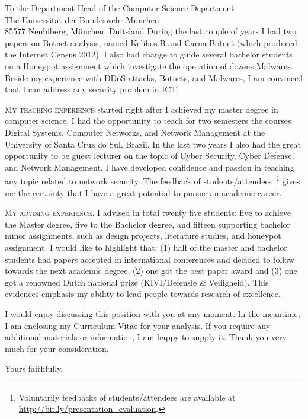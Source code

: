 \documentclass[11pt]{brownletter}
\begin{document}
\begin{letter}{To the Department Head of the Computer Science Department\\
		The Universit\"at der Bundeswehr M\"unchen\\
		85577 Neubiberg, München, Duitsland
}
\newpage
During the last couple of years I had two papers on Botnet analysis, named Kelihos.B and Carna Botnet (which produced the Internet Census 2012). I also had change to guide several bachelor students on a Honeypot assignment which investigate the operation of dozens Malwares. Beside my experience with DDoS attacks, Botnets, and Malwares, I am convinced that I can address any security problem in ICT.

\textsc{My teaching experience} started right after I achieved my master degree in computer science. I had the opportunity to teach for two semesters the courses Digital Systems, Computer Networks, and Network Management at the University of Santa Cruz do Sul, Brazil. In the last two years I also had the great opportunity to be guest lecturer on the topic of Cyber Security, Cyber Defense, and Network Management. I have developed confidence and passion in teaching any topic related to network security. The feedback of students/attendees~\footnote{Voluntarily feedbacks of students/attendees are available at \url{http://bit.ly/presentation_evaluation}.} gives me the certainty that I have a great potential to pursue an academic career.

\textsc{My advising experience.} I advised in total twenty five students: five to achieve the Master degree, five to the Bachelor degree, and fifteen supporting bachelor minor assignments, such as design projects, literature studies, and honeypot assignment. I would like to highlight that: (1) half of the master and bachelor students had papers accepted in international conferences and decided to follow towards the next academic degree, (2) one got the best paper award and (3) one got a renowned Dutch national prize (KIVI/Defensie \& Veiligheid). This evidences emphasis my ability to lead people towards research of excellence.

I would enjoy discussing this position with you at any moment. In the meantime, I am enclosing my Curriculum Vitae for your analysis. 
If you require any additional materials or information, I am happy to supply it.  Thank you very much for your consideration.

\closing{Yours faithfully,}

\end{letter}
\end{document}
